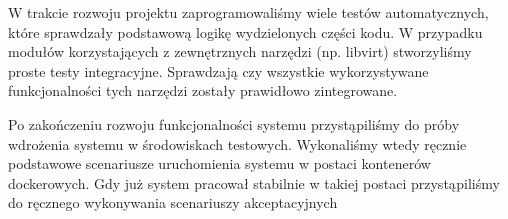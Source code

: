 \documentclass[../analiza-rozwiazania.tex]{subfiles}
\begin{document}
W trakcie rozwoju projektu zaprogramowaliśmy wiele testów automatycznych, które sprawdzały podstawową logikę wydzielonych części kodu.
W przypadku modułów korzystających z zewnętrznych narzędzi (np. libvirt) stworzyliśmy proste testy integracyjne.
Sprawdzają czy wszystkie wykorzystywane funkcjonalności tych narzędzi zostały prawidłowo zintegrowane.

Po zakończeniu rozwoju funkcjonalności systemu przystąpiliśmy do próby wdrożenia systemu w środowiskach testowych.
Wykonaliśmy wtedy ręcznie podstawowe scenariusze uruchomienia systemu w postaci kontenerów dockerowych.
Gdy już system pracował stabilnie w takiej postaci przystąpiliśmy do ręcznego wykonywania scenariuszy akceptacyjnych
\end{document}
